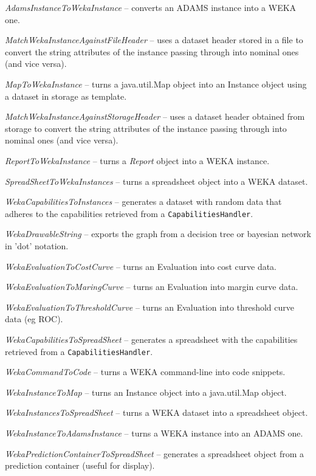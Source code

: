 \begin{tight_itemize}
	\item \textit{AdamsInstanceToWekaInstance} -- converts an ADAMS instance
	into a WEKA one.
	\item \textit{MatchWekaInstanceAgainstFileHeader} -- uses a dataset header
	stored in a file to convert the string attributes of the instance passing 
	through into nominal ones (and vice versa).
	\item \textit{MapToWekaInstance} -- turns a java.util.Map object into
	an Instance object using a dataset in storage as template.
	\item \textit{MatchWekaInstanceAgainstStorageHeader} -- uses a dataset
	header obtained from storage to convert the string attributes of the 
	instance passing through into nominal ones (and vice versa).
	\item \textit{ReportToWekaInstance} -- turns a \textit{Report} object
	into a WEKA instance.
	\item \textit{SpreadSheetToWekaInstances} -- turns a spreadsheet object
	into a WEKA dataset.
	\item \textit{WekaCapabilitiesToInstances} -- generates a dataset with
	random data that adheres to the capabilities retrieved from a
	\texttt{CapabilitiesHandler}.
	\item \textit{WekaDrawableString} -- exports the graph from a decision
	tree or bayesian network in 'dot' notation.
	\item \textit{WekaEvaluationToCostCurve} -- turns an Evaluation into
	cost curve data.
	\item \textit{WekaEvaluationToMaringCurve} -- turns an Evaluation into
	margin curve data.
	\item \textit{WekaEvaluationToThresholdCurve} -- turns an Evaluation into
	threshold curve data (eg ROC).
	\item \textit{WekaCapabilitiesToSpreadSheet} -- generates a spreadsheet
	with the  capabilities retrieved from a \texttt{CapabilitiesHandler}.
	\item \textit{WekaCommandToCode} -- turns a WEKA command-line into
	code snippets.
	\item \textit{WekaInstanceToMap} -- turns an Instance object into a
	java.util.Map object.
	\item \textit{WekaInstancesToSpreadSheet} -- turns a WEKA dataset into
	a spreadsheet object.
	\item \textit{WekaInstanceToAdamsInstance} -- turns a WEKA instance into
	an ADAMS one.
	\item \textit{WekaPredictionContainerToSpreadSheet} -- generates a 
	spreadsheet object from a prediction container (useful for display).
\end{tight_itemize}

